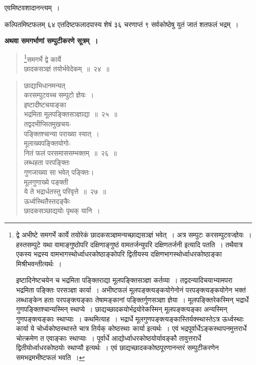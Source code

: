 \documentclass[11pt, openany]{book}
\begin{document}
एवमिष्टवशादानन्त्यम्~।
\vspace{2mm}

कल्पितमिष्टफलम् ६४ एतदिष्टफलादपास्य शेषं ३६ चरणाप्तं ९ सर्वकोष्ठेषु युतं जातं शतफलं भद्रम्~।

\newpage

\textbf{अथवा समगर्भाणां सम्पुटीकरणे सूत्रम्~।}

\begin{quote}
\renewcommand{\thefootnote}{१}\footnote{द्वे अभीष्टे समगर्भे कार्ये तयोरेकं छादकसञ्ज्ञमन्यच्छाद्यसञ्ज्ञं भवेत्~। अत्र सम्पुटः करसम्पुटवज्ज्ञेयः~। हस्तसम्पुटे यथा वामाङ्गुष्ठोपरि दक्षिणाङ्गुष्ठं वामतर्जन्युपरि दक्षिणतर्जनी इत्यादि पतति~। तथैवात्र एकस्य भद्रस्य वामभागस्थोर्ध्वाधरकोष्ठाङ्कोपरि द्वितीयस्य दक्षिणभागस्थोर्ध्वाधरकोष्ठाङ्का मिश्रीभवन्तीत्यर्थः~।
\vspace{2mm}

\hspace{3mm} इष्टादिनेष्टचयेन च भद्रमिता पङ्क्तिराद्या मूलपङ्क्तिसञ्ज्ञा कर्तव्या~। तद्वदन्यादिचयाभ्यामपरा भद्रमिता पङ्क्तिः परसञ्ज्ञा कार्या~। अभीष्टफलं मूलपङ्क्त्यङ्कयोगेनोनं परपङ्क्त्यङ्कयोगेन भक्तं लब्धाङ्केन हताः परपङ्क्त्यङ्काः तेषामङ्कानां पङ्क्तिर्गुणसञ्ज्ञा ज्ञेया~। मूलपङ्क्तिरेकस्मिन् भद्रार्धे गुणपङ्क्तिश्चान्यस्मिन् स्थाप्ये~। छाद्यच्छादकयोर्भद्रयोरेकस्मिन् मूलपङ्क्त्यङ्का अन्यस्मिन् गुणपङ्क्त्यङ्काः स्थाप्याः~। कथमित्याह~। भद्रार्धे मूलगुणपङ्क्त्यङ्कास्तिर्यक्स्थास्तेऽत्र ऊर्ध्वस्थाः कार्या ये चोर्ध्वकोष्ठस्थास्ते चात्र तिर्यक् कोष्ठस्थाः कार्या इत्यर्थः~। एवं भद्रपूर्वार्धेऽङ्कस्थापनमुत्तरार्धे चोत्क्रमेण त एवाङ्काः स्थाप्याः~। पूर्वार्धे आद्योर्ध्वाधरकोष्ठयोर्यावङ्कौ तावुत्तरार्धे द्वितीयोर्ध्वाधरकोष्ठयोः स्थाप्यौ इत्यर्थः~। एवं छाद्यच्छादककोष्ठपूरणानन्तरं सम्पुटीकरणेन समभद्रमभीष्टफलं भवति~।}{\gk समगर्भे द्वे कार्ये\\
छादकसञ्ज्ञं तयोर्भवेदेकम्~॥~२४~॥}
\end{quote}

\newpage

\begin{quote}
{\gk छाद्याभिधानमन्यत्\\
करसम्पुटवच्च सम्पुटो ज्ञेयः~।\\
इष्टादीष्टचयाङ्का\\
भद्रमिता मूलपङ्क्तिसञ्ज्ञाद्या~॥~२५~॥\\
तद्वदभीप्सितमुखचय-\\
पङ्क्तिश्चान्या पराख्या स्यात्~।\\
मूलाख्यपङ्क्तियोगो-\\
नितं फलं परसमाससम्भक्तम्~॥~२६~॥\\
लब्धहता परपङ्क्तिः\\
गुणजाख्या सा भवेत् पङ्क्तिः।\\
मूलगुणाख्ये पङ्क्ती\\
ये ते भद्रार्धतस्तु परिवृत्ते~॥~२७~॥\\
ऊर्ध्वस्थितैस्तदङ्कैः\\
छादकसञ्छाद्ययोः पृथक् यानि~।	}
\end{quote}
\end{document}
